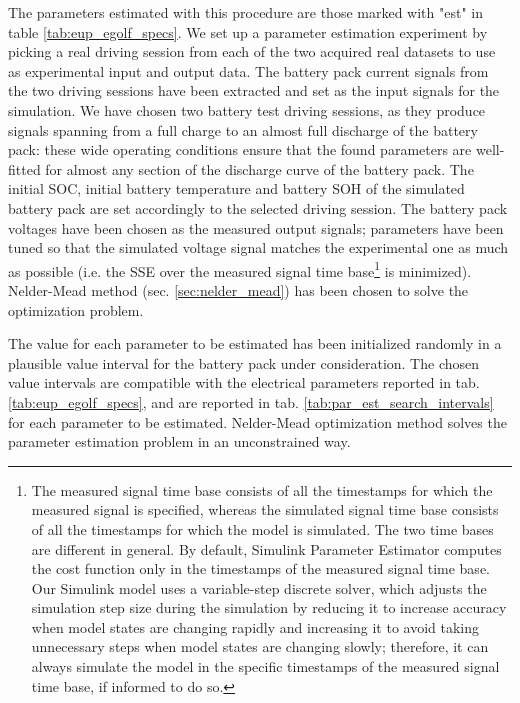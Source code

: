 The parameters estimated with this procedure are those marked with "est" in table \ref{tab:eup_egolf_specs}. We set up a parameter estimation experiment by picking a real driving session from each of the two acquired real datasets to use as experimental input and output data. The battery pack current signals from the two driving sessions have been extracted and set as the input signals for the simulation. We have chosen two battery test driving sessions, as they produce signals spanning from a full charge to an almost full discharge of the battery pack: these wide operating conditions ensure that the found parameters are well-fitted for almost any section of the discharge curve of the battery pack. The initial SOC, initial battery temperature and battery SOH of the simulated battery pack are set accordingly to the selected driving session. The battery pack voltages have been chosen as the measured output signals; parameters have been tuned so that the simulated voltage signal matches the experimental one as much as possible (i.e. the SSE over the measured signal time base\footnote{The measured signal time base consists of all the timestamps for which the measured signal is specified, whereas the simulated signal time base consists of all the timestamps for which the model is simulated. The two time bases are different in general. By default, Simulink Parameter Estimator computes the cost function only in the timestamps of the measured signal time base. Our Simulink model uses a variable-step discrete solver, which adjusts the simulation step size during the simulation by reducing it to increase accuracy when model states are changing rapidly and increasing it to avoid taking unnecessary steps when model states are changing slowly; therefore, it can always simulate the model in the specific timestamps of the measured signal time base, if informed to do so.} is minimized). Nelder-Mead method (sec. \ref{sec:nelder_mead}) has been chosen to solve the optimization problem.

The value for each parameter to be estimated has been initialized randomly in a plausible value interval for the battery pack under consideration. The chosen value intervals are compatible with the electrical parameters reported in tab. \ref{tab:eup_egolf_specs}, and are reported in tab. \ref{tab:par_est_search_intervals} for each parameter to be estimated. Nelder-Mead optimization method solves the parameter estimation problem in an unconstrained way.

